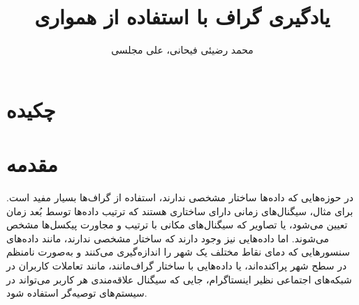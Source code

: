 \documentclass[10pt,twocolumn,a4paper]{article}
\title{یادگیری گراف با استفاده از همواری}
\author{
محمد رضیئی فیحانی،
علی مجلسی
}
\date{}
\begin{document}
%			
%			
%			
%			
%			
%			
%			
%			
%			
%			
%			
%			
%			
%			
%			
%			
%			
%			
%			
%			
%			
%			

	\maketitle
	
	\section*{چکیده}
 	\begin{strip}
 		
 	\end{strip}
	


    \section{مقدمه}
    در حوزه‌هایی که داده‌ها ساختار مشخصی ندارند، استفاده از گراف‌ها بسیار مفید است. برای مثال، سیگنال‌های زمانی دارای ساختاری هستند که ترتیب داده‌ها توسط بُعد زمان تعیین می‌شود، یا تصاویر که سیگنال‌های مکانی با ترتیب و مجاورت پیکسل‌ها مشخص می‌شوند. اما داده‌هایی نیز وجود دارند که ساختار مشخصی ندارند، مانند داده‌های سنسورهایی که دمای نقاط مختلف یک شهر را اندازه‌گیری می‌کنند و به‌صورت نامنظم در سطح شهر پراکنده‌اند، یا داده‌هایی با ساختار گراف‌مانند، مانند تعاملات کاربران در شبکه‌های اجتماعی نظیر اینستاگرام، جایی که سیگنال علاقه‌مندی هر کاربر می‌تواند در سیستم‌های توصیه‌گر استفاده شود.
    
\end{document}
